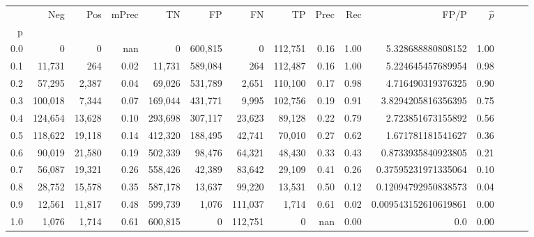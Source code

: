 \begin{tabular}{rrrrrrrrrrrrrrr}
\toprule
{} &      Neg &     Pos & mPrec &       TN &       FP &       FN &       TP &  Prec &   Rec &                  FP/P & $\hat{p}$ \\
p   &          &         &       &          &          &          &          &       &       &                       &           \\
\midrule
0.0 &        0 &       0 &   nan &        0 &  600,815 &        0 &  112,751 &  0.16 &  1.00 &     5.328688880808152 &      1.00 \\
0.1 &   11,731 &     264 &  0.02 &   11,731 &  589,084 &      264 &  112,487 &  0.16 &  1.00 &     5.224645457689954 &      0.98 \\
0.2 &   57,295 &   2,387 &  0.04 &   69,026 &  531,789 &    2,651 &  110,100 &  0.17 &  0.98 &     4.716490319376325 &      0.90 \\
0.3 &  100,018 &   7,344 &  0.07 &  169,044 &  431,771 &    9,995 &  102,756 &  0.19 &  0.91 &    3.8294205816356395 &      0.75 \\
0.4 &  124,654 &  13,628 &  0.10 &  293,698 &  307,117 &   23,623 &   89,128 &  0.22 &  0.79 &     2.723851673155892 &      0.56 \\
0.5 &  118,622 &  19,118 &  0.14 &  412,320 &  188,495 &   42,741 &   70,010 &  0.27 &  0.62 &     1.671781181541627 &      0.36 \\
0.6 &   90,019 &  21,580 &  0.19 &  502,339 &   98,476 &   64,321 &   48,430 &  0.33 &  0.43 &    0.8733935840923805 &      0.21 \\
0.7 &   56,087 &  19,321 &  0.26 &  558,426 &   42,389 &   83,642 &   29,109 &  0.41 &  0.26 &   0.37595231971335064 &      0.10 \\
0.8 &   28,752 &  15,578 &  0.35 &  587,178 &   13,637 &   99,220 &   13,531 &  0.50 &  0.12 &   0.12094792950838573 &      0.04 \\
0.9 &   12,561 &  11,817 &  0.48 &  599,739 &    1,076 &  111,037 &    1,714 &  0.61 &  0.02 &  0.009543152610619861 &      0.00 \\
1.0 &    1,076 &   1,714 &  0.61 &  600,815 &        0 &  112,751 &        0 &   nan &  0.00 &                   0.0 &      0.00 \\
\bottomrule
\end{tabular}
